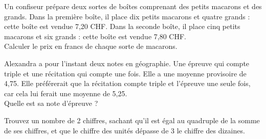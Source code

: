 \begin{exercice}
Un confiseur prépare deux sortes de boîtes comprenant des petits macarons et des grands. Dans la première boîte, il place dix petits macarons et quatre grands : cette boîte est vendue 7,20 CHF. Dans la seconde boîte, il place cinq petits macarons et six grands : cette boîte est vendue 7,80 CHF.\\
Calculer le prix en francs de chaque sorte de macarons.
\end{exercice}

\begin{exercice}
Alexandra a pour l'instant deux notes en géographie. Une épreuve qui compte triple et une récitation qui compte une fois. Elle a une moyenne provisoire de 4,75. Elle préférerait que la récitation compte triple et l'épreuve une seule fois, car cela lui ferait une moyenne de 5,25.\\
Quelle est sa note d'épreuve ?
\end{exercice}

\begin{exercice}
Trouvez un nombre de 2 chiffres, sachant qu'il est égal au quadruple de la somme de ses chiffres, et que le chiffre des unités dépasse de 3 le chiffre des dizaines.
\end{exercice}
